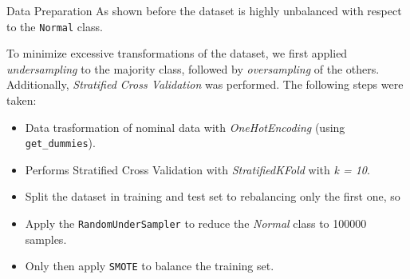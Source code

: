 \documentclass[12pt,aspectratio=169,notheorems]{beamer}
\begin{document}
\begin{frame}{Data Preparation}
    \small As shown before the dataset is highly unbalanced with respect to the \texttt{Normal} class. 
    \vspace{-0.1cm}
        \begin{table}[t]
        \end{table}
        \vspace{-0.1cm}
        \small To minimize excessive transformations of the dataset, we first applied \emph{undersampling} to the majority class, followed by \emph{oversampling} of the others. Additionally, \emph{Stratified Cross Validation} was performed. The following steps were taken:
    \begin{itemize}
        \item Data trasformation of nominal data with \emph{OneHotEncoding} (using \texttt{get\_dummies}).
        \item Performs Stratified Cross Validation with \emph{StratifiedKFold} with \emph{k = 10}.
        \item Split the dataset in training and test set to rebalancing only the first one, so
        \item Apply the \texttt{RandomUnderSampler} to reduce the \emph{Normal} class to 100000 samples.
        \item Only then apply \texttt{SMOTE} to balance the training set.
    \end{itemize}
\end{frame}
\end{document}

